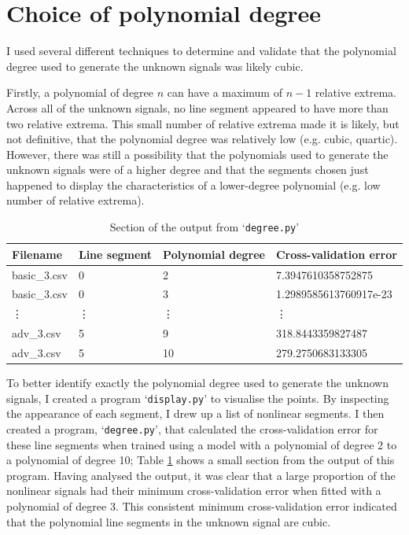 \documentclass[onecolumn, 12pt, a4paper]{article}
\begin{document}
\section{Choice of polynomial degree}

I used several different techniques to determine and validate that
the polynomial degree used to generate the unknown signals was likely cubic.

Firstly, a polynomial of degree $n$ can have a maximum of $n - 1$ relative extrema.
Across all of the unknown signals, no line segment appeared to have more than two relative extrema.
This small number of relative extrema made it is likely, but not definitive,
that the polynomial degree was relatively low (e.g. cubic, quartic).
However, there was still a possibility that the polynomials used to generate the unknown signals
were of a higher degree and that the segments chosen just happened to display
the characteristics of a lower-degree polynomial (e.g. low number of relative extrema).

\begin{table}[htbp]
    \begin{center}
        \caption{\label{tab:degree.py}Section of the output from `\texttt{degree.py}'}
    \begin{tabular}{l l l l} 
        \hline\hline
        Filename & Line segment & Polynomial degree & Cross-validation error \\ [0.5ex] 
        \hline
        basic\_3.csv & 0 & 2 & 7.3947610358752875 \\ 
        basic\_3.csv & 0 & 3 & 1.2989585613760917e-23 \\
        \vdots & \vdots & \vdots & \vdots \\
        adv\_3.csv & 5 & 9 & 318.8443359827487 \\
        adv\_3.csv & 5 & 10 & 279.2750683133305 \\
        \hline
    \end{tabular}
    \end{center}
\end{table}

To better identify exactly the polynomial degree used
to generate the unknown signals, I created a program
`\texttt{display.py}' to visualise the points.
By inspecting the appearance of each segment, I drew up
a list of nonlinear segments.
I then created a program, `\texttt{degree.py}', that calculated
the cross-validation error for these line segments
when trained using a model with a polynomial of degree 2
to a polynomial of degree 10; Table \ref{tab:degree.py}
shows a small section from the output of this program.
Having analysed the output, it was clear that a large
proportion of the nonlinear signals had their minimum
cross-validation error when fitted with a polynomial of degree
3.
This consistent minimum cross-validation error indicated
that the polynomial line segments in the unknown signal are cubic.
\end{document}
